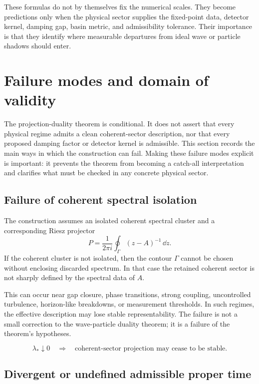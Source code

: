 \documentclass[11pt]{article}
\begin{document}
These formulas do not by themselves fix the numerical scales. They become predictions only
when the physical sector supplies the fixed-point data, detector kernel, damping gap, basin
metric, and admissibility tolerance. Their importance is that they identify where measurable
departures from ideal wave or particle shadows should enter.
\section{Failure modes and domain of validity}
\label{sec:failure-modes}

The projection-duality theorem is conditional. It does not assert that every physical regime
admits a clean coherent-sector description, nor that every proposed damping factor or detector
kernel is admissible. This section records the main ways in which the construction can fail.
Making these failure modes explicit is important: it prevents the theorem from becoming a
catch-all interpretation and clarifies what must be checked in any concrete physical sector.

\subsection{Failure of coherent spectral isolation}
\label{subsec:failure-spectral-isolation}

The construction assumes an isolated coherent spectral cluster and a corresponding Riesz
projector
\begin{equation}
  P
  =
  \frac{1}{2\pi i}
  \oint_\Gamma (z-A)^{-1}\,\dd z.
\end{equation}
If the coherent cluster is not isolated, then the contour \(\Gamma\) cannot be chosen without
enclosing discarded spectrum. In that case the retained coherent sector is not sharply defined
by the spectral data of \(A\).

This can occur near gap closure, phase transitions, strong coupling, uncontrolled turbulence,
horizon-like breakdowns, or measurement thresholds. In such regimes, the effective description
may lose stable representability. The failure is not a small correction to the wave-particle
duality theorem; it is a failure of the theorem's hypotheses.

\begin{equation}
  \lambda_\ast\downarrow0
  \quad\Longrightarrow\quad
  \text{coherent-sector projection may cease to be stable}.
\end{equation}

\subsection{Divergent or undefined admissible proper time}
\label{subsec:failure-tau}
\end{document}
